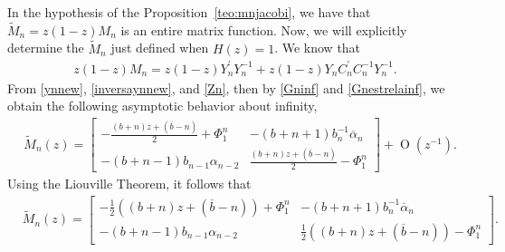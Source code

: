 \documentclass[12pt]{amsart}
\newtheorem{theorem}{Theorem}[section]
\newtheorem{corollary}{Corollary}[section]
\begin{document}
In the hypothesis of the Proposition~\ref{teo:mnjacobi}, we have that
\( \widetilde{M}_n=z(1-z)M_n \)
is an entire matrix function.
Now, we will explicitly determine the \( \widetilde M_n \) just defined when \( H (z) = 1 \).
We know that
\begin{align*}
z(1-z)M_n=z(1-z)Y_n^\prime Y_n^{-1}+z(1-z)Y_nC^\prime_n C^{-1}_n Y_n^{-1}.
\end{align*}
From \eqref{ynnew}, \eqref{inversaynnew}, and \eqref{Zn}, then by \eqref{Gninf} and \eqref{Gnestrelainf}, we obtain the following asymptotic behavior about infinity, 
{\small
\begin{align*}
& \widetilde{M}_n(z)
={\begin{bmatrix}
\displaystyle
-\frac{(b+n)z+(\overline{b}-n)}{2}+\Phi_1^n
& -(b+n+1)b_n^{-1}\overline{\alpha}_n \\
-(b+n-1)b_{n-1}\alpha_{n-2} & 
\displaystyle
\frac{(b+n)z+(\overline{b}-n)}{2} - \Phi_1^n
\end{bmatrix}} +\operatorname{O}(z^{-1}) 
 .
\end{align*}
}
{\hspace{-.075cm}}Using the Liouville Theorem, it follows that
\begin{align}\label{matriz1}
& \widetilde{M}_n(z)
=
\begin{bmatrix}
-\frac{1}{2}( (b+n)z+(\overline{b}-n) )+\Phi_1^n & -(b+n+1)b_n^{-1}\overline{\alpha}_n \\
-(b+n-1)b_{n-1}\alpha_{n-2} & \frac{1}{2} ( (b+n)z+(\overline{b}-n) ) -\Phi_1^n
\end{bmatrix} 
 .
\end{align}
\end{document}
